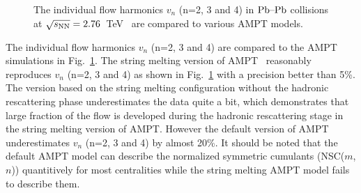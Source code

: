 \begin{figure}[h]
\begin{center}
        \caption{The individual flow harmonics $v_n$ (n=2, 3 and 4) in $\textnormal{Pb--Pb}$ collisions at $\sqrt{s_{\textnormal{NN}}}=2.76$~TeV~\cite{Adam:2016izf} are compared to various AMPT models.}
        \label{fig:Figure_10}
              \end{center}
\end{figure}

The individual flow harmonics $v_n$ (n=2, 3 and 4) are compared to the {AMPT} simulations in Fig.~\ref{fig:Figure_10}.
The string melting version of AMPT~\cite{Lin:2001zk,Lin:2004en} reasonably reproduces $v_n$ (n=2, 3 and 4) as shown in Fig.~\ref{fig:Figure_10} with a precision better than 5\%. The version based on the string melting configuration without the hadronic rescattering phase underestimates the data quite a bit, which demonstrates that large fraction of the flow is developed during the hadronic rescattering stage in the string melting version of AMPT.
However the default version of AMPT underestimates $v_n$ (n=2, 3 and 4) by almost 20\%. It should be noted that the default AMPT model can describe the normalized symmetric cumulants (NSC($m$,$n$)) quantitively for most centralities while the string melting AMPT model fails to describe them.

